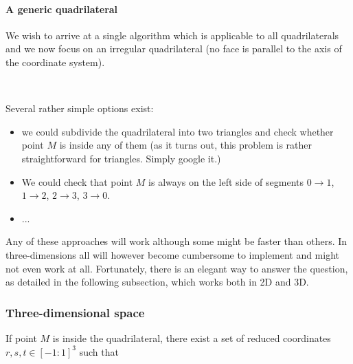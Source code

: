 \paragraph{A generic quadrilateral}

We wish to arrive at a single algorithm which is applicable to all quadrilaterals and we now focus  
on an irregular quadrilateral (no face is parallel to the axis of the coordinate system). 

\begin{center}
\\
\end{center}

\noindent Several rather simple options exist:
\begin{itemize}
\item we could subdivide the quadrilateral into two triangles and check whether point $M$ is inside any of them (as it turns out, this problem is rather straightforward for triangles. Simply google it.)
\item We could check that point $M$ is always on the left side of segments $0\rightarrow 1$, $1\rightarrow 2$, $2\rightarrow 3$, $3\rightarrow 0$.
\item ...  
\end{itemize}

Any of these approaches will work although some might be faster than others. 
In three-dimensions all will however become 
cumbersome to implement and might not even work at all. 
Fortunately, there is an elegant way to answer the question, as 
detailed in the following subsection, which works both in 2D and 3D.

\subsubsection{Three-dimensional space}

If point $M$ is inside the quadrilateral, there exist a set of reduced 
coordinates $r,s,t\in[-1:1]^3$ such that 

